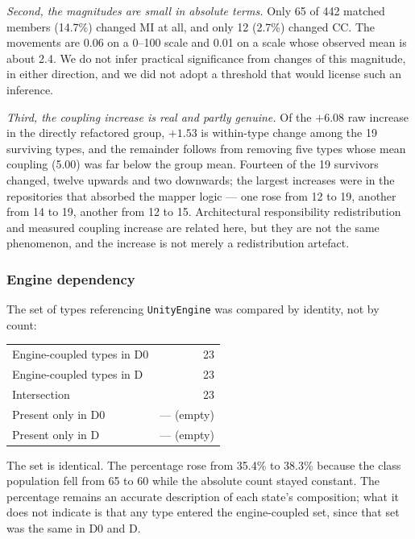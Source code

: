 \documentclass{sbc2019}%
\begin{document}
\emph{Second, the magnitudes are small in absolute terms.} Only 65 of 442 matched
members (14.7\%) changed MI at all, and only 12 (2.7\%) changed CC\@. The movements
are 0.06 on a 0--100 scale and 0.01 on a scale whose observed mean is about 2.4.
We do not infer practical significance from changes of this magnitude, in either
direction, and we did not adopt a threshold that would license such an
inference.

\emph{Third, the coupling increase is real and partly genuine.} Of the $+6.08$
raw increase in the directly refactored group, $+1.53$ is within-type change
among the 19 surviving types, and the remainder follows from removing five types
whose mean coupling (5.00) was far below the group mean. Fourteen of the 19
survivors changed, twelve upwards and two downwards; the largest increases were
in the repositories that absorbed the mapper logic --- one rose from 12 to 19,
another from 14 to 19, another from 12 to 15. Architectural responsibility
redistribution and measured coupling increase are related here, but they are not
the same phenomenon, and the increase is not merely a redistribution artefact.

\subsubsection{Engine dependency}

The set of types referencing \texttt{UnityEngine} was compared by identity, not
by count:

\begin{center}\small
\begin{tabular}{lr}
Engine-coupled types in D0 & 23 \\
Engine-coupled types in D  & 23 \\
Intersection               & 23 \\
Present only in D0         & --- (empty) \\
Present only in D          & --- (empty) \\
\end{tabular}
\end{center}

The set is identical. The percentage rose from 35.4\% to 38.3\% because the
class population fell from 65 to 60 while the absolute count stayed constant.
The percentage remains an accurate description of each state's composition; what
it does not indicate is that any type entered the engine-coupled set, since that
set was the same in D0 and D.
\end{document}
